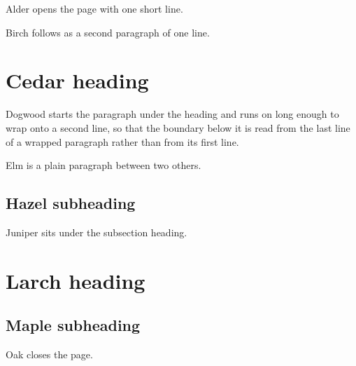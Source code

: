 \documentclass{article}
\begin{document}
Alder opens the page with one short line.

Birch follows as a second paragraph of one line.

\section{Cedar heading}
Dogwood starts the paragraph under the heading and runs on long enough to
wrap onto a second line, so that the boundary below it is read from the
last line of a wrapped paragraph rather than from its first line.

Elm is a plain paragraph between two others.

\subsection{Hazel subheading}
Juniper sits under the subsection heading.

\section{Larch heading}
\subsection{Maple subheading}
Oak closes the page.
\end{document}
